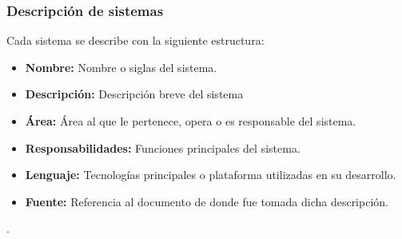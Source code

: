 %

\subsubsection{Descripción de sistemas}

Cada sistema se describe con la siguiente estructura:
\begin{itemize}
	\item \textbf{Nombre:} Nombre o siglas del sistema.
	\item \textbf{Descripción:} Descripción breve del sistema
	\item \textbf{Área:} Área al que le pertenece, opera o es responsable 
	del sistema.
	\item \textbf{Responsabilidades:} Funciones principales del sistema.
	\item \textbf{Lenguaje:} Tecnologías principales o plataforma utilizadas 
	en su desarrollo.
	\item \textbf{Fuente:} Referencia al documento de donde fue tomada dicha 
	descripción.
\end{itemize}

. \\ 
